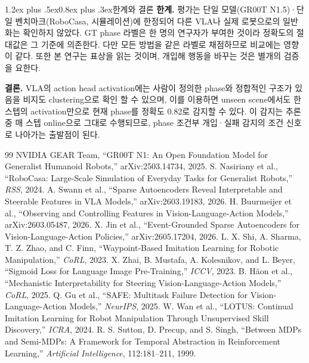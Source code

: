 \documentclass[a4paper,twocolumn,9pt]{extarticle}
\makeatletter
\renewcommand\section{\@startsection{section}{1}{\z@}%
  {1.2ex plus .5ex}{0.8ex plus .3ex}{\normalsize\bfseries}}
\makeatother
\begin{document}
\section{한계와 결론}
\textbf{한계.} 평가는 단일 모델(GR00T N1.5)·단일 벤치마크(RoboCasa, 시뮬레이션)에 한정되어 다른 VLA나 실제 로봇으로의 일반화는 확인하지 않았다. GT phase 라벨은 한 명의 연구자가 부여한 것이라 정확도의 절대값은 그 기준에 의존한다. 다만 모든 방법을 같은 라벨로 채점하므로 비교에는 영향이 같다. 또한 본 연구는 표상을 읽는 것이며, 개입해 행동을 바꾸는 것은 별개의 검증을 요한다.

\textbf{결론.} VLA의 action head activation에는 사람이 정의한 phase와 정합적인 구조가 있음을 비지도 clustering으로 확인 할 수 있으며, 이를 이용하면 unseen scene에서도 한 스텝의 activation만으로 현재 phase를 정확도 0.82로 감지할 수 있다. 이 감지는 추론 중 매 스텝 online으로 그대로 수행되므로, phase 조건부 개입·실패 감지의 조건 신호로 나아가는 출발점이 된다.

\renewcommand{\refname}{\centering 참 고 문 헌}
\begin{thebibliography}{99}\scriptsize\setlength{\itemsep}{0pt}\setlength{\parskip}{0pt}
 NVIDIA GEAR Team, ``GR00T N1: An Open Foundation Model for
Generalist Humanoid Robots,'' arXiv:2503.14734, 2025.
 S. Nasiriany et al., ``RoboCasa: Large-Scale Simulation of
Everyday Tasks for Generalist Robots,'' \textit{RSS}, 2024.
 A. Swann et al., ``Sparse Autoencoders Reveal Interpretable and
Steerable Features in VLA Models,'' arXiv:2603.19183, 2026.
 H. Buurmeijer et al., ``Observing and Controlling Features in
Vision-Language-Action Models,'' arXiv:2603.05487, 2026.
 X. Jin et al., ``Event-Grounded Sparse Autoencoders for
Vision-Language-Action Policies,'' arXiv:2605.17204, 2026.
 L. X. Shi, A. Sharma, T. Z. Zhao, and C. Finn, ``Waypoint-Based
Imitation Learning for Robotic Manipulation,'' \textit{CoRL}, 2023.
 X. Zhai, B. Mustafa, A. Kolesnikov, and L. Beyer, ``Sigmoid Loss
for Language Image Pre-Training,'' \textit{ICCV}, 2023.
 B. H\"aon et al., ``Mechanistic Interpretability for Steering
Vision-Language-Action Models,'' \textit{CoRL}, 2025.
 Q. Gu et al., ``SAFE: Multitask Failure Detection for
Vision-Language-Action Models,'' \textit{NeurIPS}, 2025.
 W. Wan et al., ``LOTUS: Continual Imitation Learning for Robot
Manipulation Through Unsupervised Skill Discovery,'' \textit{ICRA}, 2024.
 R. S. Sutton, D. Precup, and S. Singh, ``Between MDPs and Semi-MDPs:
A Framework for Temporal Abstraction in Reinforcement Learning,''
\textit{Artificial Intelligence}, 112:181--211, 1999.
\end{thebibliography}
\end{document}
